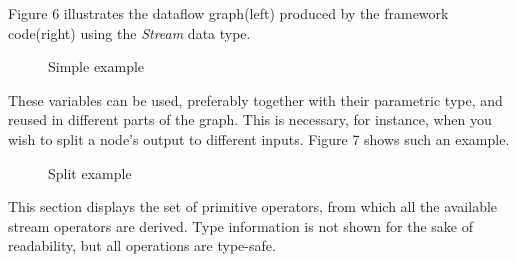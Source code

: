 \documentclass{dithesis}
\begin{document}
Figure 6 illustrates the dataflow graph(left) produced by the framework code(right) using the \textit{Stream} data type.

\begin{figure}[h!] 
	\begin{multicols}{2}
	\resizebox{0.5\textwidth}{!}{
			
	}
	\end{multicols}
	\caption{Simple example}
\end{figure}

These variables can be used, preferably together with their parametric type, and reused in different parts of the graph. This is necessary, for instance, when you wish to split a node's output to different inputs. Figure 7 shows such an example.

\begin{figure}[h!] 
	\begin{multicols}{2}
	\resizebox{0.5\textwidth}{!}{
			
	}
	\end{multicols}
	\caption{Split example}
\end{figure}

This section displays the set of primitive operators, from which all the available stream operators are derived. Type information is not shown for the sake of readability, but all operations are type-safe.
\end{document}

